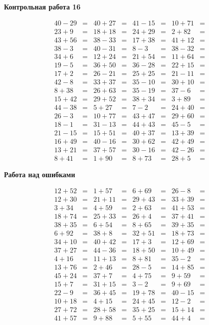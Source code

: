 \documentclass[12pt, a4paper]{article}
\begin{document}
\centerline{\textbf{Контрольная работа 16}}
\begin{align*}
    40-29&= & 40+27&= & 41-15 &= & 10+71&=\\
    23+9&= &  18+18&= & 24+29 &= & 2+82 &=\\
    43+56&=&  38-33&= & 17+38 &= & 41+12 &=\\
    38-3 &=&  40-31&= & 8-3   &= & 38-32 &=\\
    34+6 &=&  12+24 &=& 21+54 &= & 11+64 &=\\
    19-5 &=&  36+50 &=& 36-28 &= & 22+15 &=\\
    17+2 &=&  26-21 &=& 25+25 &= & 21-11 &=\\
    42-8 &=&  33+37 &=& 35-10 &= & 30+10 &=\\
    8+38 &=&  26+63 &=& 35-19 &= & 37-6 &=\\
    15+42&=&  29+52 &=& 38+34 &= & 3+89 &=\\
    44-38&=&  5+27  &=& 7-2   &= & 24+40 &=\\
    26-3 &=&  10+77 &=& 43+47 &= & 29+60 &=\\
    18-1 &=&  31-13 &=& 44+43 &= & 45-5  &=\\
    21-15&=&  15+51 &=& 40+37 &= & 13+39 &=\\
    16+49&=&  40-16 &=& 30+62 &= & 42+49 &=\\
    13+21&=&  37+57 &=& 30-16 &= & 42-26 &=\\
     8+41&=&  1+90  &=& 8+73  &= & 28+5  &=      
\end{align*}
\centerline{\textbf{Работа над ошибками}}
\begin{align*}
    12+52 &=&  1+57 &=& 6+69  &=& 26-8  &=\\
    12+30 &=& 21+11 &=& 29+43 &=& 33+39 &=\\
     3+34 &=&  4+59 &=&  2+63 &=& 41+53 &=\\
    18+74 &=& 25+33 &=& 26+4  &=& 37+41 &=\\
    38+35 &=&  6+54 &=&  8+65 &=& 39+35 &=\\
     6+92 &=&  38+8 &=& 32+51 &=& 18+73 &=\\
    34+10 &=& 40+42 &=& 17+ 3 &=& 12+69 &=\\
    37+27 &=& 44-36 &=& 18+50 &=& 10+49 &=\\
     4+16 &=& 11+13 &=&  8+81 &=& 35- 2 &=\\
    13+76 &=&  2+46 &=& 28- 5 &=& 14+85 &=\\
    45+24 &=& 37+ 7 &=&  4+75 &=&  9+59 &=\\
    15+ 7 &=& 31+15 &=&  3- 2 &=&  9+69 &=\\
    22- 9 &=& 36+45 &=& 19+78 &=& 40-15 &=\\
    10+18 &=&  4+15 &=& 24+45 &=& 12- 2 &=\\
    27+72 &=& 28+58 &=& 35+25 &=& 15+14 &=\\
    41+57 &=&  9+88 &=&  5+55 &=& 44+ 4 &= 
\end{align*}
\end{document}
